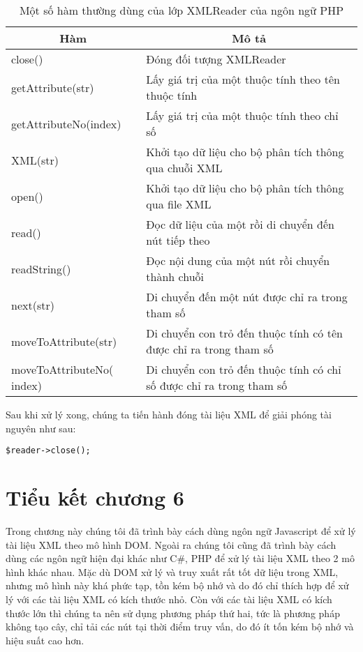 \begin{center}
\begin{longtable}{|m{4cm}|m{7cm}|}
\caption [Một số hàm thường dùng của lớp XMLReader của ngôn ngữ PHP]{Một số hàm thường dùng của lớp XMLReader của ngôn ngữ PHP}
 \endfirsthead
 \endhead
\hline
\multicolumn{1}{|c|}{\textbf{Hàm}} & \multicolumn{1}{c|}{	\textbf{Mô tả}}\\ \hline
close() &	Đóng đối tượng XMLReader\\ \hline
getAttribute(str) &	Lấy giá trị của một thuộc tính theo tên thuộc tính\\ \hline
getAttributeNo(index) &	Lấy giá trị của một thuộc tính theo chỉ số\\ \hline
XML(str) &	Khởi tạo dữ liệu cho bộ phân tích thông qua chuỗi XML\\ \hline
open()&	Khởi tạo dữ liệu cho bộ phân tích thông qua file XML\\ \hline
read()&	Đọc dữ liệu của một rồi di chuyển đến nút tiếp theo\\ \hline
readString()&	Đọc nội dung của một nút rồi chuyển thành chuỗi\\ \hline
next(str) &	Di chuyển đến một nút được chỉ ra trong tham số\\ \hline
moveToAttribute(str) &	Di chuyển con trỏ đến thuộc tính có tên được chỉ ra trong tham số\\ \hline
moveToAttributeNo( index) &	Di chuyển con trỏ đến thuộc tính có chỉ số được chỉ ra trong tham số\\ \hline

\end{longtable}
\end{center}
\vspace{-1cm}

Sau khi xử lý xong, chúng ta tiến hành đóng tài liệu XML để giải phóng tài nguyên như sau:
\lstset{language=XML}
\begin{lstlisting}[escapechar=`]
	$reader->close();
\end{lstlisting}

\section{Tiểu kết chương 6}

Trong chương này chúng tôi đã trình bày cách dùng ngôn ngữ Javascript để xử lý tài liệu XML theo mô hình DOM. Ngoài ra chúng tôi cũng đã trình bày cách dùng các ngôn ngữ hiện đại khác như C\#, PHP để xử lý tài liệu XML theo 2 mô hình khác nhau. Mặc dù DOM xử lý và truy xuất rất tốt dữ liệu trong XML, nhưng mô hình này khá phức tạp, tồn kém bộ nhớ và do đó chỉ thích hợp để xử lý với các tài liệu XML có kích thước nhỏ. Còn với các tài liệu XML có kích thước lớn thì chúng ta nên sử dụng phương pháp thứ hai, tức là phương pháp không tạo cây, chỉ tải các nút tại thời điểm truy vấn, do đó ít tốn kém bộ nhớ và hiệu suất cao hơn.
 
